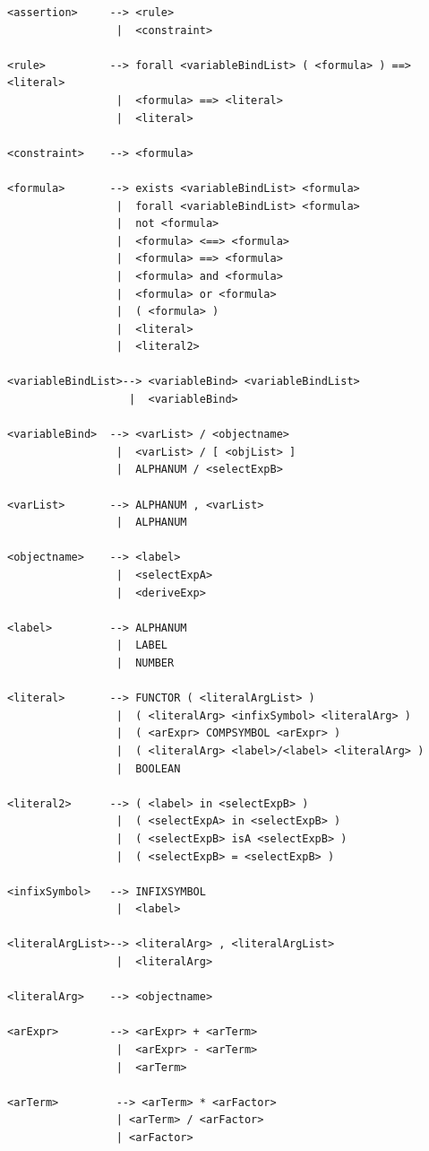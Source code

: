 {\small
\begin{verbatim}
<assertion>     --> <rule>
                 |  <constraint>

<rule>          --> forall <variableBindList> ( <formula> ) ==> <literal>
                 |  <formula> ==> <literal>
                 |  <literal>

<constraint>    --> <formula>

<formula>       --> exists <variableBindList> <formula>
                 |  forall <variableBindList> <formula>
                 |  not <formula>
                 |  <formula> <==> <formula>
                 |  <formula> ==> <formula>
                 |  <formula> and <formula>
                 |  <formula> or <formula>
                 |  ( <formula> )
                 |  <literal>
                 |  <literal2>

<variableBindList>--> <variableBind> <variableBindList>
                   |  <variableBind>

<variableBind>  --> <varList> / <objectname>
                 |  <varList> / [ <objList> ]
                 |  ALPHANUM / <selectExpB>

<varList>       --> ALPHANUM , <varList>
                 |  ALPHANUM

<objectname>    --> <label>
                 |  <selectExpA>
                 |  <deriveExp>

<label>         --> ALPHANUM
                 |  LABEL
                 |  NUMBER

<literal>       --> FUNCTOR ( <literalArgList> )
                 |  ( <literalArg> <infixSymbol> <literalArg> )
                 |  ( <arExpr> COMPSYMBOL <arExpr> )
                 |  ( <literalArg> <label>/<label> <literalArg> )
                 |  BOOLEAN

<literal2>      --> ( <label> in <selectExpB> )
                 |  ( <selectExpA> in <selectExpB> )
                 |  ( <selectExpB> isA <selectExpB> )
                 |  ( <selectExpB> = <selectExpB> )

<infixSymbol>   --> INFIXSYMBOL
                 |  <label>

<literalArgList>--> <literalArg> , <literalArgList>
                 |  <literalArg>

<literalArg>    --> <objectname>

<arExpr>        --> <arExpr> + <arTerm> 
                 |  <arExpr> - <arTerm> 
                 |  <arTerm>

<arTerm>         --> <arTerm> * <arFactor>
                 | <arTerm> / <arFactor>
                 | <arFactor>


\end{verbatim}}
